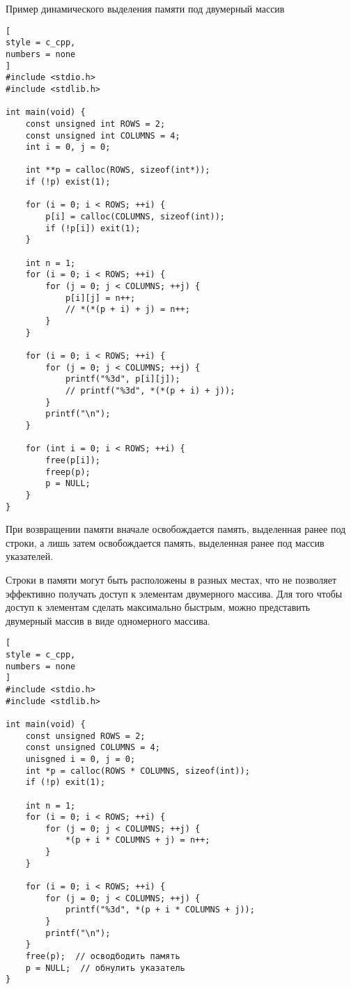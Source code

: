 \documentclass[%
	11pt,
	a4paper,
	utf8,
		]{article}
\begin{document}
Пример динамического выделения памяти под двумерный массив
\begin{lstlisting}[
style = c_cpp,
numbers = none	
]
#include <stdio.h>
#include <stdlib.h>

int main(void) {
    const unsigned int ROWS = 2;
    const unsigned int COLUMNS = 4;
    int i = 0, j = 0;
    
    int **p = calloc(ROWS, sizeof(int*));
    if (!p) exist(1);
    
    for (i = 0; i < ROWS; ++i) {
        p[i] = calloc(COLUMNS, sizeof(int));
        if (!p[i]) exit(1);
    }
    
    int n = 1;
    for (i = 0; i < ROWS; ++i) {
        for (j = 0; j < COLUMNS; ++j) {
            p[i][j] = n++;
            // *(*(p + i) + j) = n++;
        }
    }
    
    for (i = 0; i < ROWS; ++i) {
        for (j = 0; j < COLUMNS; ++j) {
            printf("%3d", p[i][j]);
            // printf("%3d", *(*(p + i) + j));
        }
        printf("\n");
    }
    
    for (int i = 0; i < ROWS; ++i) {
        free(p[i]);
        freep(p);
        p = NULL;
    }
}
\end{lstlisting}

При возвращении памяти вначале освобождается память, выделенная ранее под строки, а лишь затем освобождается память, выделенная ранее под массив указателей.

Строки в памяти могут быть расположены в разных местах, что не позволяет эффективно получать доступ к элементам двумерного массива. Для того чтобы доступ к элементам сделать максимально быстрым, можно представить двумерный массив в виде одномерного массива.
\begin{lstlisting}[
style = c_cpp,
numbers = none
]
#include <stdio.h>
#include <stdlib.h>

int main(void) {
    const unsigned ROWS = 2;
    const unsigned COLUMNS = 4;
    unisgned i = 0, j = 0;
    int *p = calloc(ROWS * COLUMNS, sizeof(int));
    if (!p) exit(1);
    
    int n = 1;
    for (i = 0; i < ROWS; ++i) {
        for (j = 0; j < COLUMNS; ++j) {
            *(p + i * COLUMNS + j) = n++;
        }
    }
    
    for (i = 0; i < ROWS; ++i) {
        for (j = 0; j < COLUMNS; ++j) {
            printf("%3d", *(p + i * COLUMNS + j));
        }
        printf("\n");
    }
    free(p);  // осводбодить память
    p = NULL;  // обнулить указатель
}
\end{lstlisting}
\end{document}
